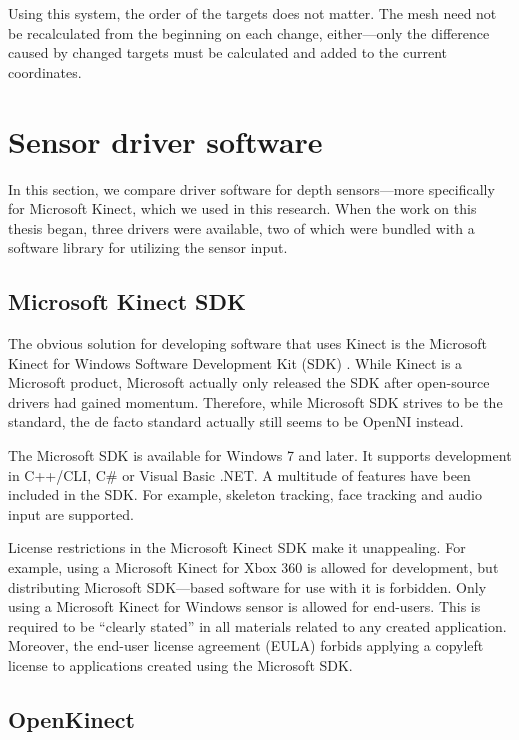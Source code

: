 Using this system, the order of the targets does not matter. The mesh need not be recalculated from the beginning on each change, either---only the difference caused by changed targets must be calculated and added to the current coordinates.


\section{Sensor driver software} \label{literature.drivers}

In this section, we compare driver software for depth sensors---more specifically for Microsoft Kinect, which we used in this research. When the work on this thesis began, three drivers were available, two of which were bundled with a software library for utilizing the sensor input.

\subsection{Microsoft Kinect SDK}

The obvious solution for developing software that uses Kinect is the Microsoft Kinect for Windows Software Development Kit (SDK) \citep{KinectSDK}. While Kinect is a Microsoft product, Microsoft actually only released the SDK after open-source drivers had gained momentum. Therefore, while Microsoft SDK strives to be the standard, the de facto standard actually still seems to be OpenNI instead.

The Microsoft SDK is available for Windows 7 and later. It supports development in C++/CLI, C\# or Visual Basic .NET. A multitude of features have been included in the SDK. For example, skeleton tracking, face tracking and audio input are supported.

License restrictions in the Microsoft Kinect SDK make it unappealing. For example, using a Microsoft Kinect for Xbox 360 is allowed for development, but distributing Microsoft SDK---based software for use with it is forbidden. Only using a Microsoft Kinect for Windows sensor is allowed for end-users. This is required to be ``clearly stated'' in all materials related to any created application. Moreover, the end-user license agreement (EULA) forbids applying a copyleft license to applications created using the Microsoft SDK. \citep{kinectEULA}

\subsection{OpenKinect}

